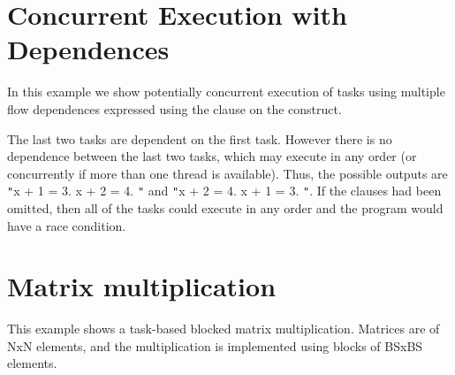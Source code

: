 \section{Concurrent Execution with Dependences}

In this example we show potentially concurrent execution of tasks using multiple 
flow dependences expressed using the  clause on the  
construct.



The last two tasks are dependent on the first task. However there is no dependence 
between the last two tasks, which may execute in any order (or concurrently if 
more than one thread is available). Thus, the possible outputs are \texttt{"}x 
+ 1 = 3. x + 2 = 4. \texttt{"} and \texttt{"}x + 2 = 4. x + 1 = 3. \texttt{"}. 
If the  clauses had been omitted, then all of the tasks could execute 
in any order and the program would have a race condition.

\section{Matrix multiplication}

This example shows a task-based blocked matrix multiplication. Matrices are of 
NxN elements, and the multiplication is implemented using blocks of BSxBS elements.



